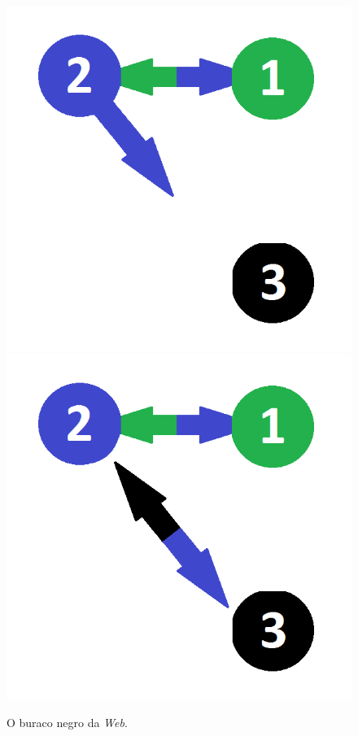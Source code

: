 \documentclass[a4paper]{report} %
\begin{document}
\
\begin{figure}[!htb]
	\centering
	\includegraphics[scale=0.3]{imagens/blackhole1}
	\hspace{0.1cm}
	\includegraphics[scale=0.3]{imagens/blackhole2}
	\caption{O buraco negro da \textit{Web}.}
	\label{blackhole}
\end{figure}
\end{document}
